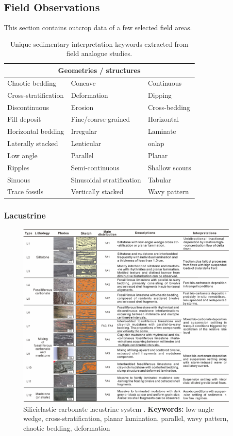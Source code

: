\clearpage
\subsection{Field Observations}
This section contains outcrop data of a few selected field areas. 
\begin{table}[h!]
\centering
\caption{Unique sedimentary interpretation keywords extracted from field analogue studies.}
\begin{tabular}{|p{4cm}|p{4cm}|p{4cm}|}
\hline
\multicolumn{3}{|c|}{\textbf{Geometries / structures}} \\
\hline
Chaotic bedding & Concave & Continuous \\
Cross-stratification & Deformation & Dipping \\
Discontinuous & Erosion & Cross-bedding \\
Fill deposit & Fine/coarse-grained & Horizontal \\
Horizontal bedding & Irregular & Laminate \\
Laterally stacked & Lenticular & onlap \\
Low angle & Parallel & Planar \\
Ripples & Semi-continuous & Shallow scours \\
Sinuous & Sinusoidal stratification & Tabular \\
Trace fossils & Vertically stacked & Wavy pattern \\
\hline
\end{tabular}
\label{tab:field-keywords}
\end{table}

\subsubsection{Lacustrine}
\begin{figure}[h!]
    \centering
    \includegraphics[width=0.75\linewidth]{Figures/0.4Field/Cui2023_trace_field_1.png}
    \caption[Siliciclastic-carbonate lacustrine system]{Siliciclastic-carbonate lacustrine system \citep{Cui2023}. \textbf{Keywords:} low-angle wedge, cross-stratification, planar lamination, parallel, wavy pattern, chaotic bedding, deformation}
    \label{fig:Cui23-1}
\end{figure}
\clearpage

